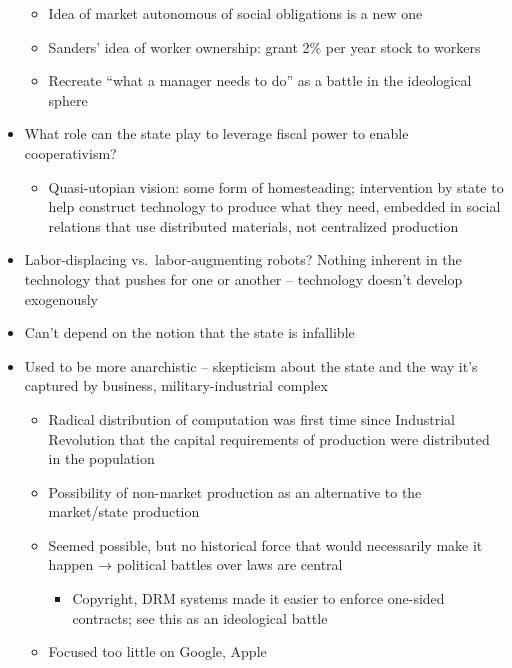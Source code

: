 \begin{itemize}
  \begin{itemize}
  \tightlist
  \item
    Idea of market autonomous of social obligations is a new one
  \item
    Sanders' idea of worker ownership: grant 2\% per year stock to
    workers
  \item
    Recreate ``what a manager needs to do'' as a battle in the
    ideological sphere
  \end{itemize}
\item
  What role can the state play to leverage fiscal power to enable
  cooperativism?

  \begin{itemize}
  \tightlist
  \item
    Quasi-utopian vision: some form of homesteading; intervention by
    state to help construct technology to produce what they need,
    embedded in social relations that use distributed materials, not
    centralized production
  \end{itemize}
\item
  Labor-displacing vs.~labor-augmenting robots? Nothing inherent in the
  technology that pushes for one or another -- technology doesn't
  develop exogenously
\item
  Can't depend on the notion that the state is infallible
\item
  Used to be more anarchistic -- skepticism about the state and the way
  it's captured by business, military-industrial complex

  \begin{itemize}
  \tightlist
  \item
    Radical distribution of computation was first time since Industrial
    Revolution that the capital requirements of production were
    distributed in the population
  \item
    Possibility of non-market production as an alternative to the
    market/state production
  \item
    Seemed possible, but no historical force that would necessarily make
    it happen → political battles over laws are central

    \begin{itemize}
    \tightlist
    \item
      Copyright, DRM systems made it easier to enforce one-sided
      contracts; see this as an ideological battle
    \end{itemize}
  \item
    Focused too little on Google, Apple


\end{itemize}
\end{itemize}
